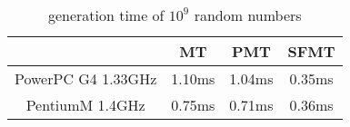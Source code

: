 \documentclass{article}
\begin{document}
\begin{table}[hb]
\begin{center}
\caption{generation time of $10^9$ random numbers\label{speed}}
\begin{tabular}{|c|c|c|c|} \hline
& MT & PMT & SFMT \\ \hline
PowerPC G4 1.33GHz & 1.10ms & 1.04ms & 0.35ms \\ \hline
PentiumM 1.4GHz & 0.75ms & 0.71ms & 0.36ms \\ \hline
\end{tabular}
\end{center}
\end{table}
\end{document}
